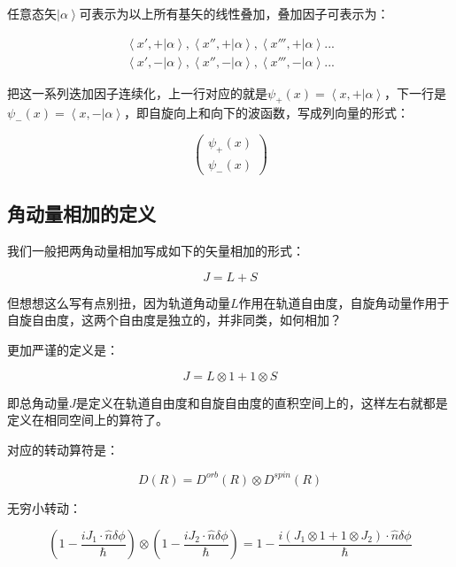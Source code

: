 任意态矢$\left| \alpha \right\rangle$可表示为以上所有基矢的线性叠加，叠加因子可表示为：

\begin{eqnarray*}
\left\langle x', + | \alpha \right\rangle, \left\langle x'', + | \alpha \right\rangle, \left\langle x''', + | \alpha \right\rangle ... \\
\left\langle x', - | \alpha \right\rangle, \left\langle x'', - | \alpha \right\rangle, \left\langle x''', - | \alpha \right\rangle ...
\end{eqnarray*}

把这一系列迭加因子连续化，上一行对应的就是$ \psi_+(x) =  \left\langle x, + | \alpha \right\rangle $，下一行是$\psi_-(x) = \left\langle x, - | \alpha \right\rangle$，即自旋向上和向下的波函数，写成列向量的形式：

\begin{equation}
\left( \begin{array} {c}  \psi_+(x)  \\  \psi_-(x)  \end{array}  \right)
\end{equation}

\subsection{角动量相加的定义}

我们一般把两角动量相加写成如下的矢量相加的形式：

\begin{equation}
J = L + S
\end{equation}

但想想这么写有点别扭，因为轨道角动量$L$作用在轨道自由度，自旋角动量作用于自旋自由度，这两个自由度是独立的，并非同类，如何相加？

更加严谨的定义是：

\begin{equation}
J = L \otimes 1 + 1 \otimes S
\end{equation}

即总角动量$J$是定义在轨道自由度和自旋自由度的直积空间上的，这样左右就都是定义在相同空间上的算符了。

对应的转动算符是：

\begin{equation}
D(R) = D^{orb}(R) \otimes D^{spin} (R)
\end{equation}

无穷小转动：

\begin{equation}
\left( 1- \frac{i J_1 \cdot \hat n \delta \phi}{ \hbar}   \right) \otimes \left( 1- \frac{i J_2 \cdot \hat n \delta \phi}{ \hbar}   \right) = 1 - \frac{ i \left( J_1 \otimes 1 + 1 \otimes J_2  \right) \cdot \hat n \delta \phi }{ \hbar}
\end{equation}

